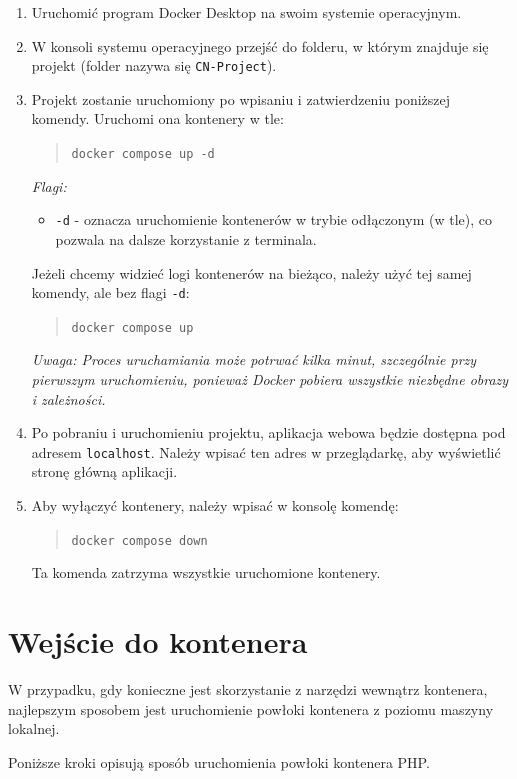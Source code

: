 \begin{enumerate} 
    \item Uruchomić program Docker Desktop na swoim systemie operacyjnym. 
    \item W konsoli systemu operacyjnego przejść do folderu, w którym znajduje się projekt (folder nazywa się \texttt{CN-Project}). 
    \item Projekt zostanie uruchomiony po wpisaniu i zatwierdzeniu poniższej komendy. Uruchomi ona kontenery w tle: 
    \begin{quote} 
        \texttt{docker compose up -d} 
    \end{quote} 
    \textit{Flagi:} 
    \begin{itemize} 
        \item \texttt{-d} - oznacza uruchomienie kontenerów w trybie odłączonym (w tle), co pozwala na dalsze korzystanie z terminala. 
    \end{itemize} Jeżeli chcemy widzieć logi kontenerów na bieżąco, należy użyć tej samej komendy, ale bez flagi \texttt{-d}: 
    \begin{quote} 
        \texttt{docker compose up}
    \end{quote} 
    \textit{Uwaga: Proces uruchamiania może potrwać kilka minut, szczególnie przy pierwszym uruchomieniu, ponieważ Docker pobiera wszystkie niezbędne obrazy i zależności.} 
    \item Po pobraniu i uruchomieniu projektu, aplikacja webowa będzie dostępna pod adresem \texttt{localhost}. Należy wpisać ten adres w przeglądarkę, aby wyświetlić stronę główną aplikacji. 
    \item Aby wyłączyć kontenery, należy wpisać w konsolę komendę: 
    \begin{quote} 
        \texttt{docker compose down} 
    \end{quote} Ta komenda zatrzyma wszystkie uruchomione kontenery. 
\end{enumerate}

\section{Wejście do kontenera}
W przypadku, gdy konieczne jest skorzystanie z narzędzi wewnątrz kontenera, najlepszym sposobem jest uruchomienie powłoki kontenera z poziomu maszyny lokalnej.

Poniższe kroki opisują sposób uruchomienia powłoki kontenera PHP.

